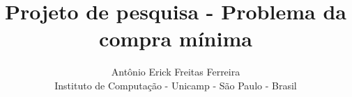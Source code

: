 \documentclass[11pt]{article}
\title{Projeto de pesquisa - Problema da compra mínima}
\author{Antônio Erick Freitas Ferreira \\
        \small Instituto de Computação - Unicamp - São Paulo - Brasil
}
\begin{document}
\onehalfspacing



\newpage





\newpage


\end{document}
